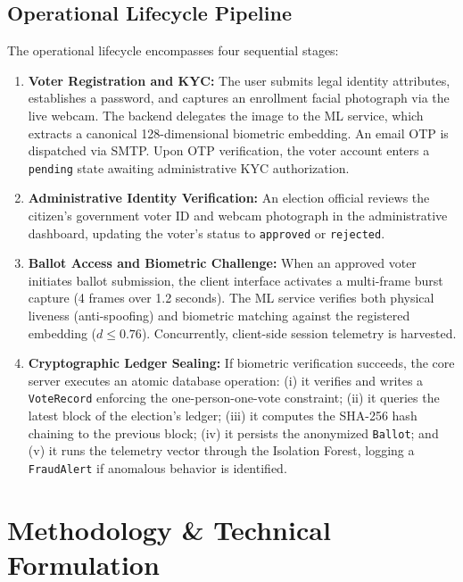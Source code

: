 \documentclass[conference]{IEEEtran}
\begin{document}
\subsection{Operational Lifecycle Pipeline}
The operational lifecycle encompasses four sequential stages:
\begin{enumerate}
    \item \textbf{Voter Registration and KYC:} The user submits legal identity attributes, establishes a password, and captures an enrollment facial photograph via the live webcam. The backend delegates the image to the ML service, which extracts a canonical 128-dimensional biometric embedding. An email OTP is dispatched via SMTP. Upon OTP verification, the voter account enters a \texttt{pending} state awaiting administrative KYC authorization.
    \item \textbf{Administrative Identity Verification:} An election official reviews the citizen's government voter ID and webcam photograph in the administrative dashboard, updating the voter's status to \texttt{approved} or \texttt{rejected}.
    \item \textbf{Ballot Access and Biometric Challenge:} When an approved voter initiates ballot submission, the client interface activates a multi-frame burst capture (4 frames over 1.2 seconds). The ML service verifies both physical liveness (anti-spoofing) and biometric matching against the registered embedding ($d \le 0.76$). Concurrently, client-side session telemetry is harvested.
    \item \textbf{Cryptographic Ledger Sealing:} If biometric verification succeeds, the core server executes an atomic database operation: (i) it verifies and writes a \texttt{VoteRecord} enforcing the one-person-one-vote constraint; (ii) it queries the latest block of the election's ledger; (iii) it computes the SHA-256 hash chaining to the previous block; (iv) it persists the anonymized \texttt{Ballot}; and (v) it runs the telemetry vector through the Isolation Forest, logging a \texttt{FraudAlert} if anomalous behavior is identified.
\end{enumerate}

\section{Methodology \& Technical Formulation}
\end{document}
